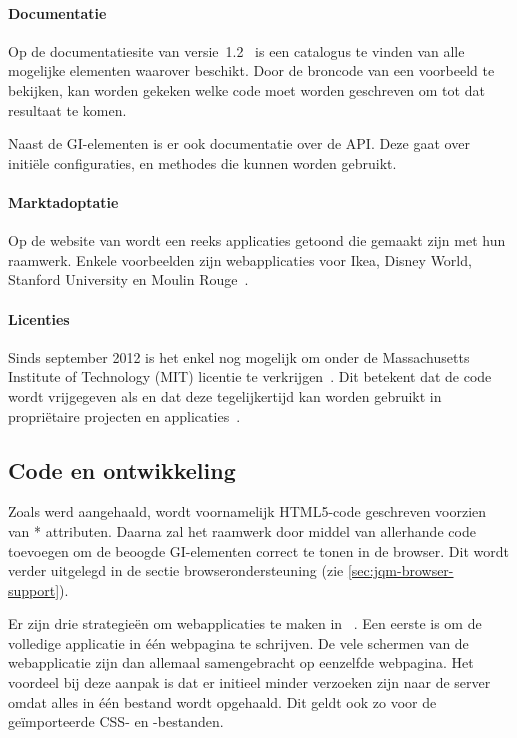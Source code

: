 \paragraph{Documentatie}
Op de documentatiesite van versie~1.2~\cite{JQuery2012b} is een catalogus te vinden van alle mogelijke elementen waarover \jqm{} beschikt. 
Door de broncode van een voorbeeld te bekijken, kan worden gekeken welke code moet worden geschreven om tot dat resultaat te komen.

Naast de GI-elementen is er ook documentatie over de API. 
Deze gaat over initiële configuraties,  en methodes die kunnen worden gebruikt.

\paragraph{Marktadoptatie}
Op de website van \jqm{} wordt een reeks applicaties getoond die gemaakt zijn met hun raamwerk. 
Enkele voorbeelden zijn webapplicaties voor Ikea, Disney World, Stanford University en Moulin Rouge~\cite{JQuery2012a}. 

\paragraph{Licenties}
Sinds september 2012 is het enkel nog mogelijk om \jqm{} onder de Massachusetts Institute of Technology (MIT) licentie te verkrijgen~\cite{Dmethvin2012}. 
Dit betekent dat de code wordt vrijgegeven als  en dat deze tegelijkertijd kan worden gebruikt in propriëtaire projecten en applicaties~\cite{PhilDutson2012}.

\subsection{Code en ontwikkeling}
Zoals werd aangehaald, wordt voornamelijk HTML5-code geschreven voorzien van * attributen. 
Daarna zal het raamwerk door middel van  allerhande code toevoegen om de beoogde GI-elementen correct te tonen in de browser. 
Dit wordt verder uitgelegd in de sectie browserondersteuning (zie \ref{sec:jqm-browser-support}).

Er zijn drie strategieën om webapplicaties te maken in \jqm{}~\cite{Broulik2012}. 
Een eerste is om de volledige applicatie in één webpagina te schrijven. 
De vele schermen van de webapplicatie zijn dan allemaal samengebracht op eenzelfde webpagina. 
Het voordeel bij deze aanpak is dat er initieel minder verzoeken zijn naar de server omdat alles in één bestand wordt opgehaald. 
Dit geldt ook zo voor de geïmporteerde CSS- en \js{}-bestanden. 

